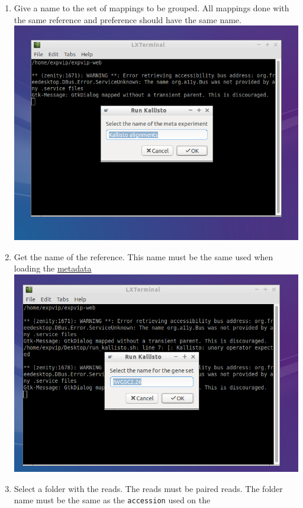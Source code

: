 \begin{enumerate}
\item
  Give a name to the set of mappings to be grouped. All mappings done
  with the same reference and preference should have the same name.
  \includegraphics{images/RunKallisto03.png}
\item
  Get the name of the reference. This name must be the same used when
  loading the \href{LoadingMetadata}{metadata}
  \includegraphics{images/RunKallisto04.png}
\item
  Select a folder with the reads. The reads must be paired reads. The
  folder name must be the same as the \lstinline!accession! used on the

\end{enumerate}
